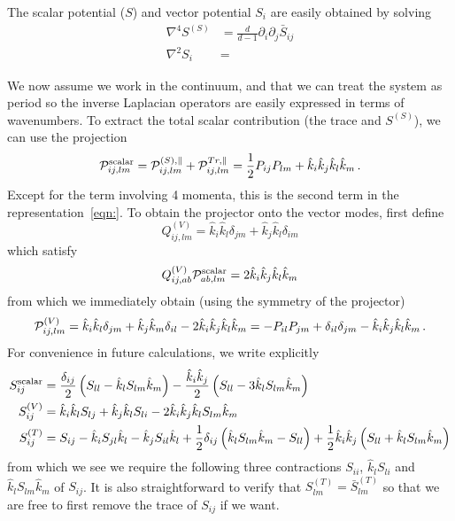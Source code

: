 \documentclass{revtex4}
\begin{document}
The scalar potential ($S$) and vector potential $S_i$ are easily obtained by solving
\begin{subequations}
  \begin{align}
    \nabla^4 S^{(S)} &= \frac{d}{d-1}\partial_i\partial_j\bar{S}_{ij} \\
    \nabla^2 S_i &=
  \end{align}
\end{subequations}

We now assume we work in the continuum, and that we can treat the system as period so the inverse Laplacian operators are easily expressed in terms of wavenumbers.
To extract the total scalar contribution (the trace and $S^{(S)}$), we can use the projection
\begin{equation}
   \mathcal{P}^{{\rm scalar}}_{ij,lm} = \mathcal{P}_{ij,lm}^{(S),\parallel} + \mathcal{P}_{ij,lm}^{Tr,\parallel} = \frac{1}{2}P_{ij}P_{lm} + \hat{k}_i\hat{k}_j\hat{k}_l\hat{k}_m \, .
\end{equation}
Except for the term involving 4 momenta, this is the second term in the representation~\eqref{eqn:}.
To obtain the projector onto the vector modes, first define
\begin{equation}
  Q^{(V)}_{ij,lm} = \hat{k}_i\hat{k}_l\delta_{jm} + \hat{k}_j\hat{k}_l\delta_{im}
\end{equation}
which satisfy
\begin{equation}
  Q^{(V)}_{ij,ab}\mathcal{P}^{{\rm scalar}}_{ab,lm} = 2\hat{k}_i\hat{k}_j\hat{k}_l\hat{k}_m
\end{equation}
from which we immediately obtain (using the symmetry of the projector)
\begin{equation}
  \mathcal{P}_{ij,lm}^{(V)} = \hat{k}_i\hat{k}_l\delta_{jm} + \hat{k}_j\hat{k}_m\delta_{il} - 2\hat{k}_i\hat{k}_j\hat{k}_l\hat{k}_m = -P_{il}P_{jm} + \delta_{il}\delta_{jm} - \hat{k}_i\hat{k}_j\hat{k}_l\hat{k}_m \, .
\end{equation}
For convenience in future calculations, we write explicitly
\begin{subequations}
\begin{align}
  S_{ij}^{\rm scalar} &= \frac{\delta_{ij}}{2}\left(S_{ll} - \hat{k}_lS_{lm}\hat{k}_m\right) - \frac{\hat{k}_i\hat{k}_j}{2}\left(S_{ll} - 3\hat{k}_lS_{lm}\hat{k}_m\right) \\
  S_{ij}^{(V)} &= \hat{k}_i\hat{k}_lS_{lj} + \hat{k}_j\hat{k}_lS_{li} - 2\hat{k}_i\hat{k}_j\hat{k}_lS_{lm}\hat{k}_m \\
  S_{ij}^{(T)} &= S_{ij} - \hat{k}_iS_{jl}\hat{k}_l - \hat{k}_jS_{il}\hat{k}_l + \frac{1}{2}\delta_{ij}\left(\hat{k}_lS_{lm}\hat{k}_m - S_{ll}\right) + \frac{1}{2}\hat{k}_i\hat{k}_j\left(S_{ll}+\hat{k}_lS_{lm}\hat{k}_m\right) \\
\end{align}
\end{subequations}
from which we see we require the following three contractions $S_{ii}$, $\hat{k}_lS_{li}$ and $\hat{k}_lS_{lm}\hat{k}_m$ of $S_{ij}$.
It is also straightforward to verify that $S_{lm}^{(T)} = \bar{S}_{lm}^{(T)}$ so that we are free to first remove the trace of $S_{ij}$ if we want.
\end{document}
